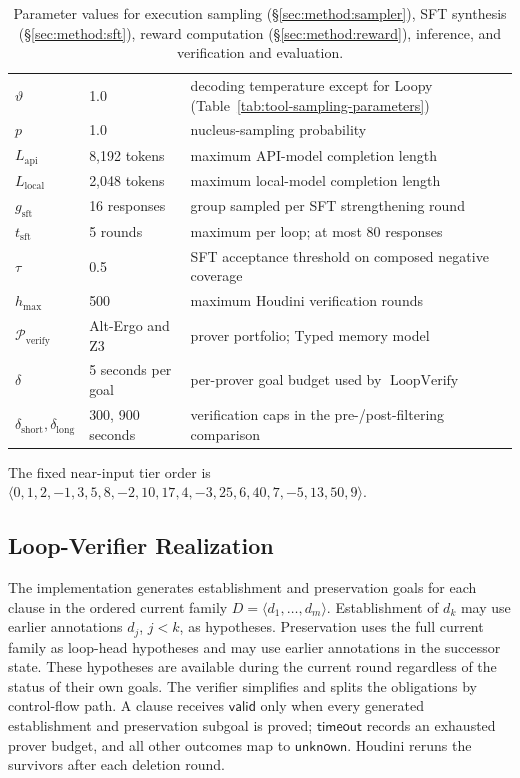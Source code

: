 \begin{table}[H]
\begin{tabular}{p{2.6cm}p{3.1cm}p{5.9cm}}
\(\vartheta\) & 1.0 & decoding temperature except for Loopy (Table~\ref{tab:tool-sampling-parameters}) \\
\(p\) & 1.0 & nucleus-sampling probability \\
\(L_{\mathrm{api}}\) & 8,192 tokens & maximum API-model completion length \\
\(L_{\mathrm{local}}\) & 2,048 tokens & maximum local-model completion length \\
\midrule
\(g_{\mathrm{sft}}\) & 16 responses & group sampled per SFT strengthening round \\
\(t_{\mathrm{sft}}\) & 5 rounds & maximum per loop; at most 80 responses \\
\(\tau\) & 0.5 & SFT acceptance threshold on composed negative coverage \\
\midrule
\(h_{\max}\) & 500 & maximum Houdini verification rounds \\
\(\mathcal P_{\mathrm{verify}}\) & Alt-Ergo and Z3 & prover portfolio; Typed memory model \\
\(\delta\) & 5 seconds per goal & per-prover goal budget used by \(\operatorname{LoopVerify}\) \\
\(\delta_{\mathrm{short}},\delta_{\mathrm{long}}\) & 300, 900 seconds & verification caps in the pre-/post-filtering comparison \\
\bottomrule
\end{tabular}
\caption{Parameter values for execution sampling
(\S\ref{sec:method:sampler}), SFT synthesis (\S\ref{sec:method:sft}),
reward computation (\S\ref{sec:method:reward}), inference, and
verification and evaluation.}
\label{tab:constants}
\end{table}
The fixed near-input tier order is
\(
\langle 0,1,2,-1,3,5,8,-2,10,17,4,-3,25,6,40,7,-5,13,50,9\rangle.
\)

\subsection{Loop-Verifier Realization}
\label{app:loop-verifier-realization}

The implementation generates establishment and preservation goals for each
clause in the ordered current family \(D=\langle d_1,\ldots,d_m\rangle\).
Establishment of \(d_k\) may use earlier annotations \(d_j\), \(j<k\), as
hypotheses.  Preservation uses the full current family as loop-head
hypotheses and may use earlier annotations in the successor state.  These
hypotheses are available during the current round regardless of the status of
their own goals.  The verifier simplifies and splits the obligations by
control-flow path.  A clause receives \(\mathsf{valid}\) only when every
generated establishment and preservation subgoal is proved;
\(\mathsf{timeout}\) records an exhausted prover budget, and all other
outcomes map to \(\mathsf{unknown}\).  Houdini reruns the survivors after each
deletion round.


